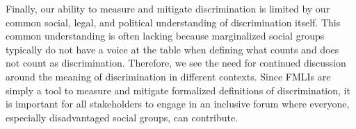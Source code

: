 \documentclass{acm_proc_article-sp}
\begin{document}
Finally, our ability to measure and mitigate discrimination is limited by our
common social, legal, and political understanding of discrimination itself. This
common understanding is often lacking because marginalized social groups
typically do not have a voice at the table when defining what counts and does
not count as discrimination. Therefore, we see the need for continued discussion
around the meaning of discrimination in different contexts. Since FMLIs are
simply a tool to measure and mitigate formalized definitions of discrimination,
it is important for all stakeholders to engage in an inclusive forum where
everyone, especially disadvantaged social groups, can contribute.

\nocite{*}


\end{document}
